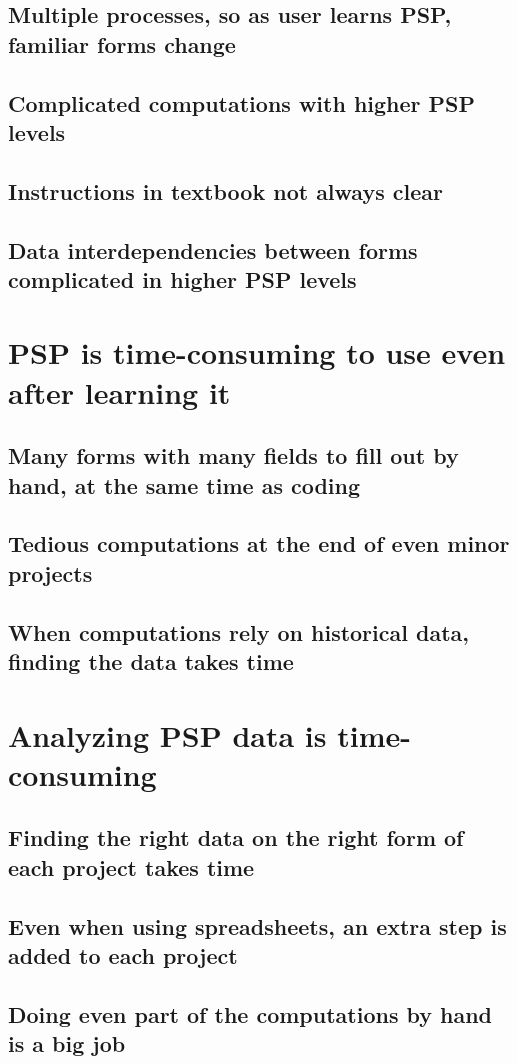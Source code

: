 \subsection{Multiple processes, so as user learns PSP, familiar forms change}
\subsection{Complicated computations with higher PSP levels}
\subsection{Instructions in textbook not always clear}
\subsection{Data interdependencies between forms complicated in higher PSP levels}
\section{PSP is time-consuming to use even after learning it}
\subsection{Many forms with many fields to fill out by hand, at the same time as coding}
\subsection{Tedious computations at the end of even minor projects}
\subsection{When computations rely on historical data, finding the data takes time}
\section{Analyzing PSP data is time-consuming}
\subsection{Finding the right data on the right form of each project takes time}
\subsection{Even when using spreadsheets, an extra step is added to each project}
\subsection{Doing even part of the computations by hand is a big job}
